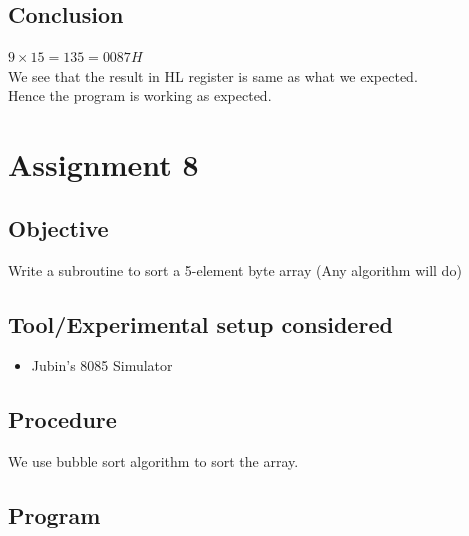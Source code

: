 \documentclass[a4paper]{article} %
\begin{document}
    \subsection{Conclusion}
        $9\times15=135 = 0087H$\\
        We see that the result in HL register is same as what we expected.\\
        Hence the program is working as expected.
\newpage

\section[Sort Subroutine]{Assignment 8} %
    \subsection{Objective}
        Write a subroutine to sort a 5-element byte array (Any algorithm will do)
    \subsection{Tool/Experimental setup considered}
        \begin{itemize}
            \item Jubin's 8085 Simulator
        \end{itemize}
    \subsection{Procedure}
        We use bubble sort algorithm to sort the array.
    \subsection{Program}
        
        \newpage
\end{document}
